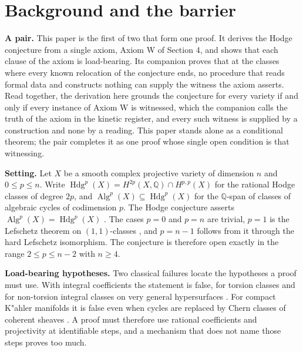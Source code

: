 \documentclass[10pt,twocolumn]{article}
\begin{document}
\thispagestyle{fancy}

\hypertarget{background-and-the-barrier}{%
\section{Background and the barrier}\label{background-and-the-barrier}}

\textbf{A pair.} This paper is the first of two that form one proof. It
derives the Hodge conjecture from a single axiom, Axiom W of Section 4,
and shows that each clause of the axiom is load-bearing. Its companion
\cite{islam2026term} proves that at the classes where every known
relocation of the conjecture ends, no procedure that reads formal data
and constructs nothing can supply the witness the axiom asserts. Read
together, the derivation here grounds the conjecture for every variety
if and only if every instance of Axiom W is witnessed, which the
companion calls the truth of the axiom in the kinetic register, and
every such witness is supplied by a construction and none by a reading.
This paper stands alone as a conditional theorem; the pair completes it
as one proof whose single open condition is that witnessing.

\textbf{Setting.} Let \(X\) be a smooth complex projective variety of
dimension \(n\) and \(0\le p\le n\). Write
\(\operatorname{Hdg}^p(X)=H^{2p}(X,\mathbb{Q})\cap H^{p,p}(X)\) for the
rational Hodge classes of degree \(2p\), and
\(\operatorname{Alg}^p(X)\subseteq\operatorname{Hdg}^p(X)\) for the
\(\mathbb{Q}\)-span of classes of algebraic cycles of codimension \(p\).
The Hodge conjecture asserts
\(\operatorname{Alg}^p(X)=\operatorname{Hdg}^p(X)\)
\cite{hodge1952,deligne2006}. The cases \(p=0\) and \(p=n\) are trivial,
\(p=1\) is the Lefschetz theorem on \((1,1)\)-classes
\cite{lefschetz1924}, and \(p=n-1\) follows from it through the hard
Lefschetz isomorphism. The conjecture is therefore open exactly in the
range \(2\le p\le n-2\) with \(n\ge 4\).

\textbf{Load-bearing hypotheses.} Two classical failures locate the
hypotheses a proof must use. With integral coefficients the statement is
false, for torsion classes \cite{ah1962} and for non-torsion integral
classes on very general hypersurfaces \cite{kollar1992}. For compact
K"ahler manifolds it is false even when cycles are replaced by Chern
classes of coherent sheaves \cite{voisin2002}. A proof must therefore
use rational coefficients and projectivity at identifiable steps, and a
mechanism that does not name those steps proves too much.
\end{document}
